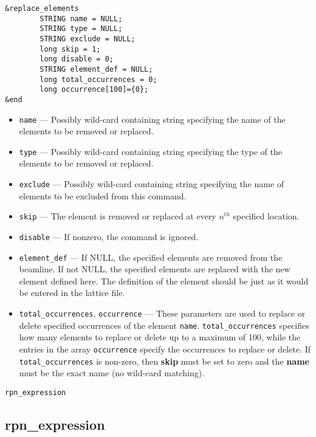 \documentclass[11pt]{article}
\begin{document}
\begin{verbatim}
&replace_elements
        STRING name = NULL;
        STRING type = NULL;
        STRING exclude = NULL;
        long skip = 1;
        long disable = 0;
        STRING element_def = NULL;
        long total_occurrences = 0;
        long occurrence[100]={0};
&end
\end{verbatim}

\begin{itemize}
\item \verb|name| --- Possibly wild-card containing string specifying the
	name of the elements to be removed or replaced.
\item \verb|type| --- Possibly wild-card containing string specifying the
   type of the elements to be removed or replaced.
\item \verb|exclude| --- Possibly wild-card containing string specifying 
	the name of elements to be excluded from this command.
\item \verb|skip| --- The element is removed or replaced at every $n^{th}$ 
   specified location.
\item \verb|disable| --- If nonzero, the command is ignored.
\item \verb|element_def| --- If NULL, the specified elements are removed from
   the beamline. If not NULL, the specified elements are replaced with the new element
   defined here. The definition of the element should be just as it would be entered in 
   the lattice file.
\item \verb|total_occurrences|, \verb|occurrence| --- 
These parameters are used to replace or delete specified occurrences of 
the element \verb|name|.  \verb|total_occurrences| specifies how many elements to replace
or delete up to a maximum of 100, while the entries in the array \verb|occurrence| specify the occurrences
to replace or delete. If \verb|total_occurrences| is non-zero, then {\bf skip} must
be set to zero  and the {\bf name} must be the exact name (no wild-card matching). 
\end{itemize}

\newpage
\begin{center}{\Large\verb|rpn_expression|}\end{center}
\subsection{rpn\_expression \label{subsec:rpnexpression}}
\end{document}
